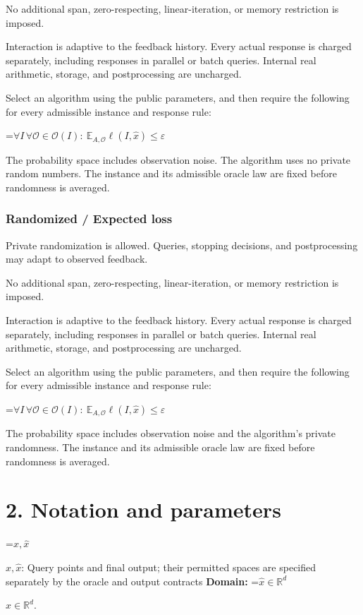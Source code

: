 \documentclass[10pt,a4paper]{article}
\newcommand{\AtlasMath}[1]{\par\begingroup\centering\setbox0=\hbox{$\displaystyle #1$}\ifdim\wd0>1.4\linewidth\typeout{ATLAS WIDE FORMULA: \the\wd0}\fi\ifdim\wd0>\linewidth\resizebox{\linewidth}{!}{\box0}\else\box0\fi\par\endgroup}
\newcommand{\AtlasInlineMath}[1]{\begingroup\setbox0=\hbox{$#1$}\ifdim\wd0>.4\linewidth\endgroup\AtlasMath{#1}\else\endgroup$#1$\fi}
\begin{document}
No additional span, zero-respecting, linear-iteration, or memory restriction is imposed.

Interaction is adaptive to the feedback history. Every actual response is charged separately, including responses in parallel or batch queries. Internal real arithmetic, storage, and postprocessing are uncharged.

Select an algorithm using the public parameters, and then require the following for every admissible instance and response rule:


\AtlasMath{\forall I\,\forall\mathcal{O}\in\mathcal{O}(I):\ \mathbb{E}_{A,\mathcal{O}}\ell(I,\widehat{x})\le\varepsilon}


The probability space includes observation noise. The algorithm uses no private random numbers. The instance and its admissible oracle law are fixed before randomness is averaged.

\subsubsection{Randomized / Expected loss}
Private randomization is allowed. Queries, stopping decisions, and postprocessing may adapt to observed feedback.

No additional span, zero-respecting, linear-iteration, or memory restriction is imposed.

Interaction is adaptive to the feedback history. Every actual response is charged separately, including responses in parallel or batch queries. Internal real arithmetic, storage, and postprocessing are uncharged.

Select an algorithm using the public parameters, and then require the following for every admissible instance and response rule:


\AtlasMath{\forall I\,\forall\mathcal{O}\in\mathcal{O}(I):\ \mathbb{E}_{A,\mathcal{O}}\ell(I,\widehat{x})\le\varepsilon}


The probability space includes observation noise and the algorithm's private randomness. The instance and its admissible oracle law are fixed before randomness is averaged.

\section{2. Notation and parameters}
\AtlasInlineMath{x,\widehat{x}}: Query points and final output; their permitted spaces are specified separately by the oracle and output contracts \textbf{Domain:} \AtlasInlineMath{\widehat{x}\in \mathbb{R}^d}.
\end{document}
